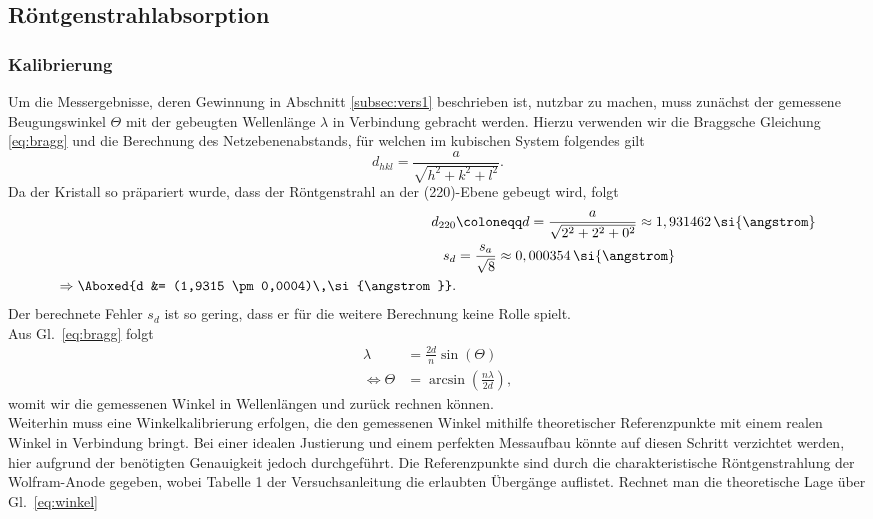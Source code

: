\subsection{\label{subsec:A1}Röntgenstrahlabsorption}
\subsubsection{Kalibrierung}
Um die Messergebnisse, deren Gewinnung in Abschnitt 
\ref{subsec:vers1} beschrieben ist, nutzbar zu machen, muss zunächst 
der gemessene Beugungswinkel $\Theta$ mit der gebeugten Wellenlänge $\lambda$ 
in Verbindung gebracht werden. Hierzu verwenden wir die Braggsche 
Gleichung \eqref{eq:bragg} und die Berechnung des Netzebenenabstands, für 
welchen im kubischen System folgendes gilt
\begin{equation}
    d_{hkl} = \frac{a}{\sqrt{h^{2} + k^{2} + l^{2}}}.
\end{equation}
Da der Kristall so präpariert wurde, dass der Röntgenstrahl an der (220)-Ebene gebeugt wird,
folgt
\begin{align}
    d_{220} &\coloneqq d = \frac{a}{\sqrt{2^{2} + 2^{2} + 0^{2}}} \approx 1,931462\,\si{\angstrom} \\
    s_{d} &= \frac{s_{a}}{\sqrt{8}} \approx 0,000354\,\si{\angstrom} \\
    \Rightarrow \Aboxed{d &= (1,9315 \pm 0,0004)\,\si{\angstrom}}.
\end{align}
Der berechnete Fehler $s_{d}$ ist so gering, dass er für die weitere Berechnung keine Rolle spielt. \\
Aus Gl.~\eqref{eq:bragg} folgt 
\begin{align}
    \lambda &= \frac{2d}{n}\sin(\Theta)  \label{eq:welle} \\
    \Leftrightarrow \Theta &= \arcsin\left(\frac{n\lambda}{2d}\right), \label{eq:winkel}
\end{align}
womit wir die gemessenen Winkel in Wellenlängen und zurück rechnen können. \\
Weiterhin muss eine Winkelkalibrierung erfolgen, die den gemessenen Winkel mithilfe
theoretischer Referenzpunkte mit einem realen Winkel in Verbindung bringt. 
Bei einer idealen Justierung und einem perfekten Messaufbau könnte auf diesen Schritt 
verzichtet werden, hier aufgrund der benötigten Genauigkeit jedoch durchgeführt.
Die Referenzpunkte sind durch die charakteristische Röntgenstrahlung der Wolfram-Anode 
gegeben, wobei Tabelle 1 der Versuchsanleitung \cite{Anleitung} die erlaubten 
Übergänge auflistet. Rechnet man die theoretische Lage über Gl.~\eqref{eq:winkel} 
